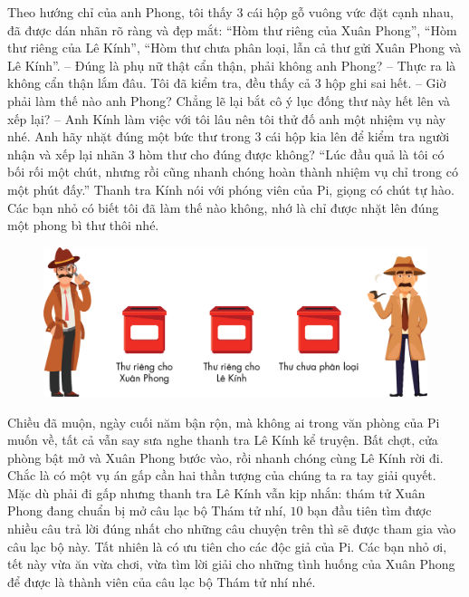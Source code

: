 	\vskip 0.1cm
	Theo hướng chỉ của anh Phong, tôi thấy $3$ cái hộp gỗ vuông vức đặt cạnh nhau, đã được dán nhãn rõ ràng và đẹp mắt: “Hòm thư riêng của Xuân Phong”, “Hòm thư riêng của Lê Kính”, “Hòm thư chưa phân loại, lẫn cả thư gửi Xuân Phong và Lê Kính”. 
	\vskip 0.1cm
	-- Đúng là phụ nữ thật cẩn thận, phải không anh Phong? 
	\vskip 0.1cm
	-- Thực ra là không cẩn thận lắm đâu. Tôi đã kiểm tra, đều thấy cả $3$ hộp ghi sai hết. 
	\vskip 0.1cm
	-- Giờ phải làm thế nào anh Phong? Chẳng lẽ lại bắt cô ý lục đống thư này hết lên và xếp lại? 
	\vskip 0.1cm
	-- Anh Kính làm việc với tôi lâu nên tôi thử đố anh một nhiệm vụ này nhé. Anh hãy nhặt đúng một bức thư trong $3$ cái hộp kia lên để kiểm tra người nhận và xếp lại nhãn $3$ hòm thư cho đúng được không? 
	\vskip 0.1cm
	“Lúc đầu quả là tôi có bối rối một chút, nhưng rồi cũng nhanh chóng hoàn thành nhiệm vụ chỉ trong có một phút đấy.” Thanh tra Kính nói với phóng viên của Pi, giọng có chút tự hào.
	\vskip 0.1cm
	Các bạn nhỏ có biết tôi đã làm thế nào không, nhớ là chỉ được nhặt lên đúng một phong bì thư thôi nhé.
		\begin{figure}[H]
			\centering
			\vspace*{-5pt}
			\captionsetup{labelformat= empty, justification=centering}
			\includegraphics[width=1\linewidth]{5}
			\vspace*{-15pt}
		\end{figure}
	Chiều đã muộn, ngày cuối năm bận rộn, mà không ai trong văn phòng của Pi muốn về, tất cả vẫn say sưa nghe thanh tra Lê Kính kể truyện. Bất chợt, cửa phòng bật mở và Xuân Phong bước vào, rồi nhanh chóng cùng Lê Kính rời đi. Chắc là có một vụ án gấp cần hai thần tượng của chúng ta ra tay giải quyết. Mặc dù phải đi gấp nhưng thanh tra Lê Kính vẫn kịp nhắn: thám tử Xuân Phong đang chuẩn bị mở câu lạc bộ Thám tử nhí, $10$ bạn đầu tiên tìm được nhiều câu trả lời đúng nhất cho những câu chuyện trên thì sẽ được tham gia vào câu lạc bộ này. Tất nhiên là có ưu tiên cho các độc giả của Pi. Các bạn nhỏ ơi, tết này vừa ăn vừa chơi, vừa tìm lời giải cho những tình huống của Xuân Phong để được là thành viên của câu lạc bộ Thám tử nhí nhé.
	
